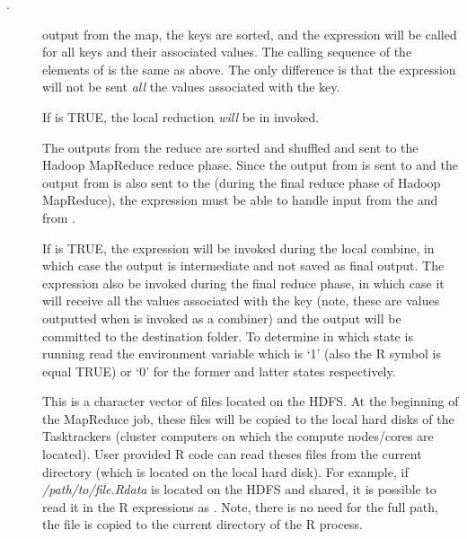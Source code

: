 \documentclass[letterpaper,10pt,english]{sphinxmanual}
\begin{document}
\begin{description}
\item[{.}] \leavevmode
output from the map, the keys are sorted, and  the expression 
will be called for all keys and their associated values. The calling sequence
of the elements of  is the same as above. The only difference is
that the expression will not be sent \emph{all} the values associated with the
key.

If  is TRUE, the local reduction  \emph{will} be in invoked.

The outputs from the reduce are sorted and shuffled and sent to the Hadoop
MapReduce reduce phase.  Since the output from  is sent to 
and the output from  is also sent to the  (during the
final reduce phase of Hadoop MapReduce), the  expression must be
able to handle input from the  and from .

If  is TRUE,  the  expression will be invoked during
the local combine, in which case the output is intermediate and not saved as
final output. The  expression also be invoked during the final reduce phase, in which
case it will receive all the values associated with the key (note, these are
values outputted when  is invoked as a combiner) and the output will
be committed to the destination folder. To determine in which state 
is running read the environment variable  which is `1' (also the R symbol  is equal TRUE)
or `0' for the former and latter states respectively.

\item[{}] \leavevmode
This is a character vector of files located on the HDFS. At the
beginning of the MapReduce job, these files will be copied to the local hard
disks of the Tasktrackers (cluster computers on which the compute nodes/cores are located). User provided R code can read theses files from the
current directory (which is located on the local hard disk). For example, if
\emph{/path/to/file.Rdata} is located on the HDFS and shared, it is possible to
read it in the R expressions as . Note, there is no
need for the full path, the file is copied to the current directory of the R
process.


\end{description}
\end{document}

